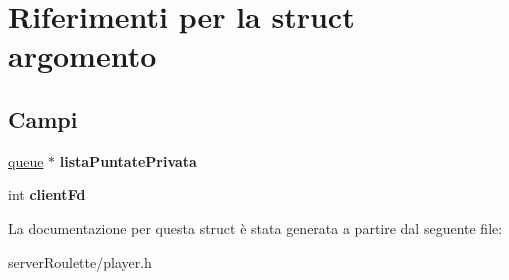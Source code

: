 \hypertarget{structargomento}{
\section{Riferimenti per la struct argomento}
\label{structargomento}
}
\subsection*{Campi}
\begin{DoxyCompactItemize}
\item 
\hypertarget{structargomento_a79fda4be21b8c1d52acb07fd02a3561e}{
\hyperlink{structqueue}{queue} $\ast$ {\bfseries listaPuntatePrivata}}
\label{structargomento_a79fda4be21b8c1d52acb07fd02a3561e}

\item 
\hypertarget{structargomento_aa11ca5a41f6a88dbbc3971ddf375509b}{
int {\bfseries clientFd}}
\label{structargomento_aa11ca5a41f6a88dbbc3971ddf375509b}

\end{DoxyCompactItemize}


La documentazione per questa struct è stata generata a partire dal seguente file:\begin{DoxyCompactItemize}
\item 
serverRoulette/player.h\end{DoxyCompactItemize}
